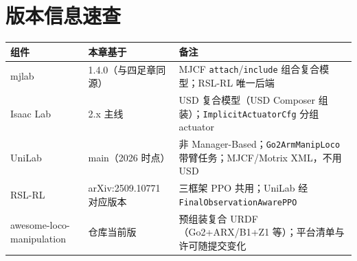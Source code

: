 \section{版本信息速查}
\label{sec:rlmc-lm-versions}

\begin{center}
\small
\begin{tabular}{@{}lll@{}}
\toprule
组件 & 本章基于 & 备注 \\
\midrule
mjlab & 1.4.0（与四足章同源）& MJCF \verb|attach|/\verb|include| 组合复合模型；RSL-RL 唯一后端 \\
Isaac Lab & 2.x 主线 & USD 复合模型（USD Composer 组装）；\verb|ImplicitActuatorCfg| 分组 actuator \\
UniLab & main（2026 时点）& 非 Manager-Based；\verb|Go2ArmManipLoco| 带臂任务；MJCF/Motrix XML，不用 USD \\
RSL-RL & arXiv:2509.10771 对应版本 & 三框架 PPO 共用；UniLab 经 \verb|FinalObservationAwarePPO| \\
awesome-loco-manipulation & 仓库当前版 & 预组装复合 URDF（Go2+ARX/B1+Z1 等）；平台清单与许可随提交变化 \\
\bottomrule
\end{tabular}
\end{center}

